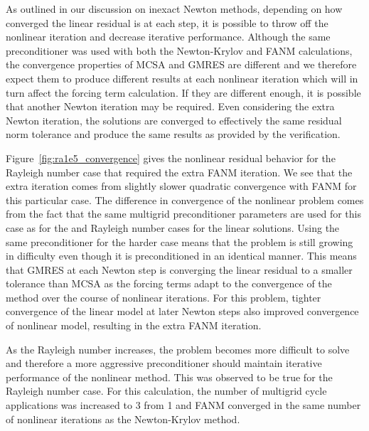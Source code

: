 As outlined in our discussion on inexact Newton methods, depending on
how converged the linear residual is at each step, it is possible to
throw off the nonlinear iteration and decrease iterative
performance. Although the same preconditioner was used with both the
Newton-Krylov and FANM calculations, the convergence properties of
MCSA and GMRES are different and we therefore expect them to produce
different results at each nonlinear iteration which will in turn
affect the forcing term calculation. If they are different enough, it
is possible that another Newton iteration may be required. Even
considering the extra Newton iteration, the solutions are converged to
effectively the same residual norm tolerance and produce the same
results as provided by the verification.

Figure~\ref{fig:ra1e5_convergence} gives the nonlinear residual
behavior for the  Rayleigh number case that required the
extra FANM iteration. We see that the extra iteration comes from
slightly slower quadratic convergence with FANM for this particular
case. The difference in convergence of the nonlinear problem comes
from the fact that the same multigrid preconditioner parameters are
used for this case as for the  and  Rayleigh number
cases for the linear solutions. Using the same preconditioner for the
harder  case means that the problem is still growing in
difficulty even though it is preconditioned in an identical
manner. This means that GMRES at each Newton step is converging the
linear residual to a smaller tolerance than MCSA as the forcing terms
adapt to the convergence of the method over the course of nonlinear
iterations. For this problem, tighter convergence of the linear model
at later Newton steps also improved convergence of nonlinear model,
resulting in the extra FANM iteration.

As the Rayleigh number increases, the problem becomes more difficult
to solve and therefore a more aggressive preconditioner should
maintain iterative performance of the nonlinear method. This was
observed to be true for the  Rayleigh number case. For this
calculation, the number of multigrid cycle applications was increased
to 3 from 1 and FANM converged in the same number of nonlinear
iterations as the Newton-Krylov method.

